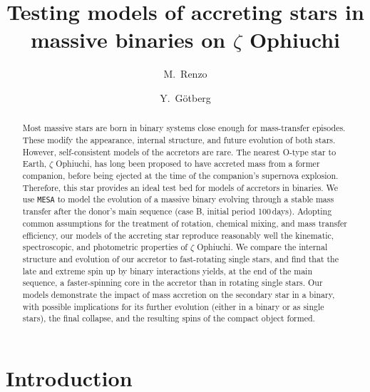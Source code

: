 \documentclass[twocolumn,twocolappendix,trackchanges]{aastex63}
\begin{document}
\graphicspath{{./figures/}}


\title{Testing models of accreting stars in
  massive binaries on $\zeta$ Ophiuchi}
\author[0000-0002-6718-9472]{M.~Renzo}

\author[0000-0002-6960-6911]{Y.~G\"otberg}


\begin{abstract}
  Most massive stars are born in binary systems close enough
  for mass-transfer episodes. These modify the appearance, internal
  structure, and future evolution of both stars. However,
  self-consistent models of the accretors are rare.  The nearest
  O-type star to Earth, $\zeta$ Ophiuchi, has long been
  proposed to have accreted mass from a former companion, before being
  ejected at the time of the companion's supernova
  explosion. Therefore, this star provides an ideal test bed for
  models of accretors in binaries. We use %
  \texttt{MESA} to model the evolution of a massive binary evolving
  through a stable mass transfer after the donor's main sequence (case
  B, initial period 100\,days). Adopting common assumptions for the
  treatment of rotation, chemical mixing, and mass transfer
  efficiency, our models of the accreting star reproduce reasonably
  well the kinematic, spectroscopic, and photometric properties of
  $\zeta$ Ophiuchi. We compare the internal structure and evolution of
  our accretor to fast-rotating single stars, and find that the late
  and extreme spin up by binary interactions yields, at the end of the
  main sequence, a faster-spinning core in the accretor than in
  rotating single stars. Our models demonstrate the impact of mass
  accretion on the secondary star in a binary, with possible
  implications for its further evolution (either in a binary or as
  single stars), the final collapse, and the resulting spins of the
  compact object formed.
\end{abstract}

\vspace*{-10pt}

\section{Introduction}
\label{sec:intro}
\end{document}
